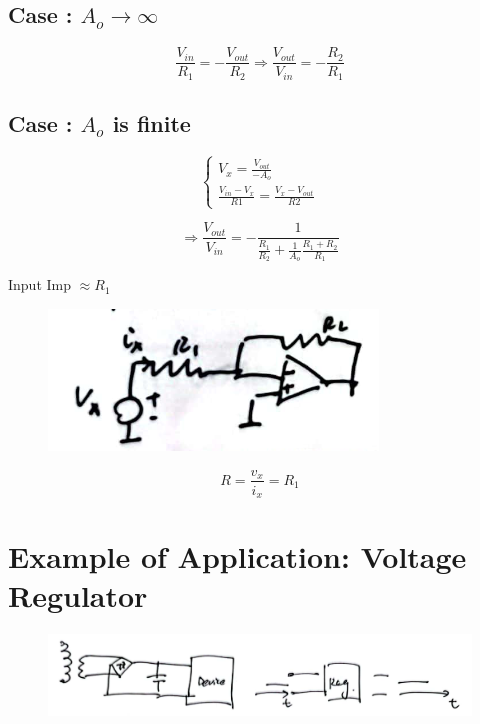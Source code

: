 \documentclass[fontset=windows]{article}
\begin{document}
\subsection*{Case \uppercase\expandafter{}: $A_o\to \infty$}

$$\frac{V_{in}}{R_1}=-\frac{V_{out}}{R_2}\Longrightarrow \frac{V_{out}}{V_{in}}=-\frac{R_2}{R_1}$$

\subsection*{Case \uppercase\expandafter{}: $A_o$ is finite}

\begin{equation*}
    \begin{cases}
        V_x=\frac{V_{out}}{-A_o} \\
        \frac{V_{in}-V_x}{R1}=\frac{V_x-V_{out}}{R2}
    \end{cases}
\end{equation*}

$$\Longrightarrow \frac{V_{out}}{V_{in}}=-\frac{1}{\frac{R_1}{R_2}+\frac{1}{A_o}\frac{R_1+R_2}{R_1}}$$

Input Imp $\approx R_1$

\begin{figure}[htbp]
    \centering
    \includegraphics[scale=0.8]{8.jpg}
    \captionsetup{labelformat=empty}
    \caption{}
    \label{8}
\end{figure}

$$R=\frac{v_x}{i_x}=R_1$$

\section*{Example of Application: Voltage Regulator}

\begin{figure}[htbp]
    \centering
    \includegraphics[scale=0.8]{9.jpg}
    \captionsetup{labelformat=empty}
    \caption{}
    \label{9}
\end{figure}
\end{document}
